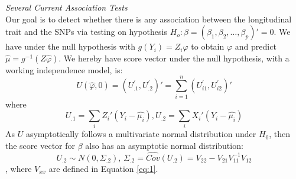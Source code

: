 \documentclass[12pt]{article}
\begin{document}
\textit{Several Current Association Tests}\\
Our goal is to detect whether there is any association between the longitudinal trait and the SNPs via testing on hypothesis $H_{o}:\beta=(\beta_{1},\beta_{2},\ldots,\beta_{p})'=0$. We have under the null hypothesis with $g(Y_i)=Z_i\varphi$ to obtain $\varphi$ and predict $\hat{\mu}=g^{-1}(Z\hat{\varphi})$. We hereby have score vector under the null hypothesis, with a working independence model, is:
$$U(\hat{\varphi},0)=(U_{.1}^{'}, U_{.2}^{'})'=\sum_{i=1}^{n}(U_{i1}^{'},U_{i2}^{'})'$$
where
$$U_{.1}=\sum_{i}Z_{i}'(Y_{i}-\hat{\mu_{i}}), U_{.2}=\sum_{i}X_{i}'(Y_{i}-\hat{\mu_{i}})$$ 
As $U$ asymptotically follows a multivariate normal distribution under $H_{0}$, then the score vector for $\beta$ also has an asymptotic normal distribution:\\
$$
U_{.2}\sim N(0,\Sigma_{.2}),\,\Sigma_{.2}= \widehat{Cov} (U_{.2}) = V_{22} - V_{21} V_{11}^{-1} V_{12}
$$, where $V_{xx}$ are defined in Equation \ref{eq:1}.
\end{document}
